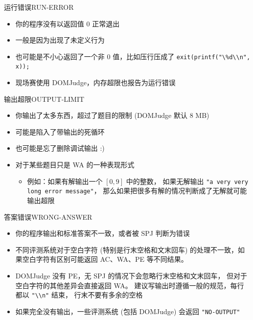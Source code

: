 \documentclass[10pt,mathserif]{beamer}
\begin{document}
\begin{frame}{运行错误}{RUN-ERROR}
	\begin{itemize}
		\item 你的程序没有以返回值 $0$ 正常退出
		\item 一般是因为出现了未定义行为
		\item 也可能是不小心返回了一个非 $0$ 值，比如压行压成了
			\lstinline{exit(printf("\%d\\n", x));}
		\item 现场赛使用 DOMJudge，内存超限也报告为运行错误
	\end{itemize}
\end{frame}

\begin{frame}{输出超限}{OUTPUT-LIMIT}
	\begin{itemize}
		\item 你输出了太多东西，超过了题目的限制 (DOMJudge 默认 $8$ MB)
		\item 可能是陷入了带输出的死循环
		\item 也可能是忘了删除调试输出 :)
		\item 对于某些题目只是 WA 的一种表现形式
			\begin{itemize}
				\item 例如：如果有解输出一个 $[0,9]$ 中的整数，
					如果无解输出
					\lstinline!"a very very long error message"!，
					那么如果把很多有解的情况判断成了无解就可能输出超限
			\end{itemize}
	\end{itemize}
\end{frame}

\begin{frame}{答案错误}{WRONG-ANSWER}
	\begin{itemize}
		\item 你的程序输出和标准答案不一致，或者被 SPJ 判断为错误
		\item 不同评测系统对于空白字符 (特别是行末空格和文末回车)
			的处理不一致，如果空白字符有区别可能返回 AC、WA、PE 等不同结果。
		\item DOMJudge 没有 PE，无 SPJ 的情况下会忽略行末空格和文末回车，
			但对于空白字符的其他差异会直接返回 WA。
			建议写输出时遵循一般的规范，每行都以 \lstinline!"\\n"! 结束，
			行末不要有多余的空格
		\item 如果完全没有输出，一些评测系统 (包括 DOMJudge) 会返回
			\lstinline{"NO-OUTPUT"}
	\end{itemize}
\end{frame}
\end{document}
